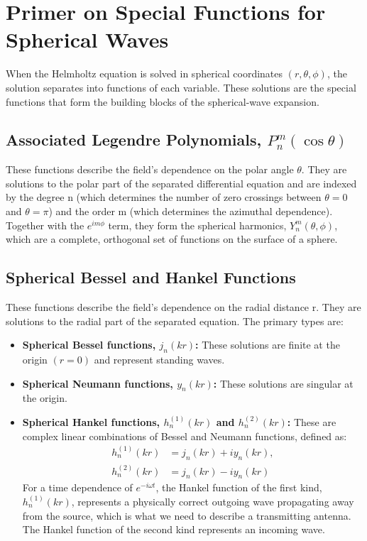 \documentclass[11pt,a4paper]{article}
\begin{document}
\section{Primer on Special Functions for Spherical Waves}

When the Helmholtz equation is solved in spherical coordinates \((r, \theta, \phi)\), the solution separates into functions of each variable. These solutions are the special functions that form the building blocks of the spherical-wave expansion.

\subsection{Associated Legendre Polynomials, \(P_{n}^{m}(\cos\theta)\)}

These functions describe the field's dependence on the polar angle \(\theta\). They are solutions to the polar part of the separated differential equation and are indexed by the degree n (which determines the number of zero crossings between \(\theta=0\) and \(\theta=\pi\)) and the order m (which determines the azimuthal dependence). Together with the \(e^{im\phi}\) term, they form the spherical harmonics, \(Y_{n}^{m}(\theta,\phi)\), which are a complete, orthogonal set of functions on the surface of a sphere.

\subsection{Spherical Bessel and Hankel Functions}

These functions describe the field's dependence on the radial distance r. They are solutions to the radial part of the separated equation. The primary types are:
\begin{itemize}
    \item \textbf{Spherical Bessel functions, \(j_{n}(kr)\):} These solutions are finite at the origin \((r=0)\) and represent standing waves.
    \item \textbf{Spherical Neumann functions, \(y_{n}(kr)\):} These solutions are singular at the origin.
    \item \textbf{Spherical Hankel functions, \(h_{n}^{(1)}(kr)\) and \(h_{n}^{(2)}(kr)\):} These are complex linear combinations of Bessel and Neumann functions, defined as:
    \begin{align}
        h_{n}^{(1)}(kr) &= j_{n}(kr)+iy_{n}(kr), \\
        h_{n}^{(2)}(kr) &= j_{n}(kr)-iy_{n}(kr)
    \end{align}
    For a time dependence of \(e^{-i\omega t}\), the Hankel function of the first kind, \(h_{n}^{(1)}(kr)\), represents a physically correct outgoing wave propagating away from the source, which is what we need to describe a transmitting antenna. The Hankel function of the second kind represents an incoming wave.
\end{itemize}
\end{document}
